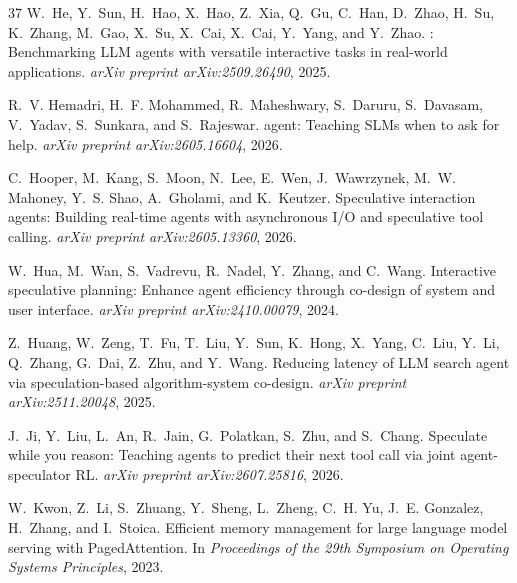 \documentclass[11pt, copyright, logo, secondlogo]{template/lark}
\begin{document}
\begin{thebibliography}{37}
W.~He, Y.~Sun, H.~Hao, X.~Hao, Z.~Xia, Q.~Gu, C.~Han, D.~Zhao, H.~Su, K.~Zhang,
  M.~Gao, X.~Su, X.~Cai, X.~Cai, Y.~Yang, and Y.~Zhao.
: Benchmarking {LLM} agents with versatile interactive
  tasks in real-world applications.
\newblock \emph{arXiv preprint arXiv:2509.26490}, 2025.

R.~V. Hemadri, H.~F. Mohammed, R.~Maheshwary, S.~Daruru, S.~Davasam, V.~Yadav,
  S.~Sunkara, and S.~Rajeswar.
 agent: Teaching {SLM}s when to ask for help.
\newblock \emph{arXiv preprint arXiv:2605.16604}, 2026.

C.~Hooper, M.~Kang, S.~Moon, N.~Lee, E.~Wen, J.~Wawrzynek, M.~W. Mahoney, Y.~S.
  Shao, A.~Gholami, and K.~Keutzer.
\newblock Speculative interaction agents: Building real-time agents with
  asynchronous {I/O} and speculative tool calling.
\newblock \emph{arXiv preprint arXiv:2605.13360}, 2026.

W.~Hua, M.~Wan, S.~Vadrevu, R.~Nadel, Y.~Zhang, and C.~Wang.
\newblock Interactive speculative planning: Enhance agent efficiency through
  co-design of system and user interface.
\newblock \emph{arXiv preprint arXiv:2410.00079}, 2024.

Z.~Huang, W.~Zeng, T.~Fu, T.~Liu, Y.~Sun, K.~Hong, X.~Yang, C.~Liu, Y.~Li,
  Q.~Zhang, G.~Dai, Z.~Zhu, and Y.~Wang.
\newblock Reducing latency of {LLM} search agent via speculation-based
  algorithm-system co-design.
\newblock \emph{arXiv preprint arXiv:2511.20048}, 2025.

J.~Ji, Y.~Liu, L.~An, R.~Jain, G.~Polatkan, S.~Zhu, and S.~Chang.
\newblock Speculate while you reason: Teaching agents to predict their next
  tool call via joint agent-speculator {RL}.
\newblock \emph{arXiv preprint arXiv:2607.25816}, 2026.

W.~Kwon, Z.~Li, S.~Zhuang, Y.~Sheng, L.~Zheng, C.~H. Yu, J.~E. Gonzalez,
  H.~Zhang, and I.~Stoica.
\newblock Efficient memory management for large language model serving with
  {PagedAttention}.
\newblock In \emph{Proceedings of the 29th Symposium on Operating Systems
  Principles}, 2023.


\end{thebibliography}
\end{document}
